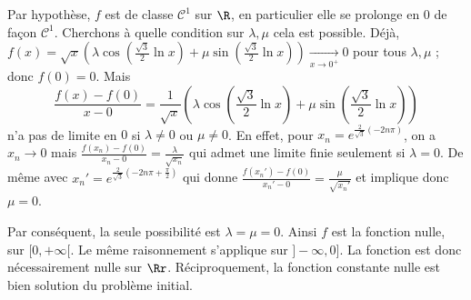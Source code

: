 {\begin{enumerate}
{Par hypothèse, $f$ est de classe $\mathcal{C}^1$ sur $\R$, en particulier 
elle se prolonge en $0$ de façon $\mathcal{C}^1$. Cherchons à quelle condition 
sur $\lambda,\mu$ cela est possible. Déjà, 
$f(x)=\sqrt{x}\left(\lambda\cos(\frac{\sqrt{3}}{2}\ln x)+\mu\sin(\frac{\sqrt{3}}{2}\ln x)\right)
\xrightarrow[x\to 0^+]{}0$ pour tous $\lambda,\mu$ ; donc $f(0)=0$. Mais
$$\frac{f(x)-f(0)}{x-0}= \frac1{\sqrt{x}}
\left(\lambda\cos(\frac{\sqrt{3}}{2}\ln x)+\mu\sin(\frac{\sqrt{3}}{2}\ln x)\right)$$ 
n'a pas de limite en $0$ si $\lambda\neq0$ ou $\mu\neq0$. En effet, pour 
$x_n=e^{\frac{2}{\sqrt{3}}(-2n\pi)}$, on a $x_n\to 0$ 
mais $\frac{f(x_n)-f(0)}{x_n-0}=\frac{\lambda}{\sqrt{x_n}}$ qui admet une limite finie seulement si $\lambda = 0$.
De même avec $x_n'=e^{\frac{2}{\sqrt{3}}(-2n\pi+\frac\pi2)}$ qui donne
$\frac{f(x_n')-f(0)}{x_n'-0}=\frac{\mu}{\sqrt{x_n'}}$ et implique donc $\mu=0$.


Par conséquent, la seule possibilité est $\lambda=\mu=0$. Ainsi $f$ est la fonction nulle, sur $[0,+\infty[$.
Le même raisonnement s'applique sur $]-\infty,0]$. La fonction est donc nécessairement nulle sur $\Rr$.
Réciproquement, la fonction constante nulle est bien solution du problème initial.}
\end{enumerate}
}

